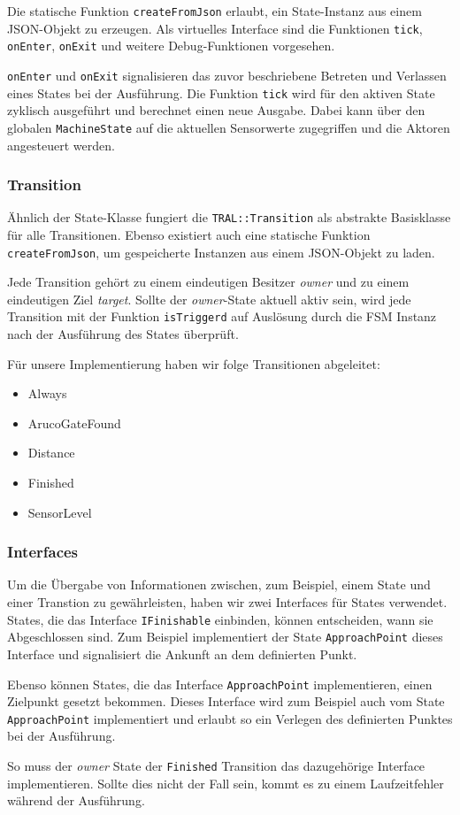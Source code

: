 Die statische Funktion \texttt{createFromJson} erlaubt, ein State-Instanz aus einem JSON-Objekt zu erzeugen. Als virtuelles Interface sind die Funktionen \texttt{tick}, \texttt{onEnter}, \texttt{onExit} und weitere Debug-Funktionen vorgesehen.

\texttt{onEnter} und \texttt{onExit} signalisieren das zuvor beschriebene Betreten und Verlassen eines States bei der Ausführung. Die Funktion \texttt{tick} wird für den aktiven State zyklisch ausgeführt und berechnet einen neue Ausgabe. Dabei kann über den globalen \texttt{MachineState} auf die aktuellen Sensorwerte zugegriffen und die Aktoren angesteuert werden.


\subsubsection{Transition}
Ähnlich der State-Klasse fungiert die \texttt{TRAL::Transition} als abstrakte Basisklasse für alle Transitionen. Ebenso existiert auch eine statische Funktion \texttt{createFromJson}, um gespeicherte Instanzen aus einem JSON-Objekt zu laden. 

Jede Transition gehört zu einem eindeutigen Besitzer \textit{owner} und zu einem eindeutigen Ziel \textit{target}. Sollte der \textit{owner}-State aktuell aktiv sein, wird jede Transition mit der Funktion \texttt{isTriggerd} auf Auslösung durch die FSM Instanz nach der Ausführung des States überprüft.

Für unsere Implementierung haben wir folge Transitionen abgeleitet:

\begin{itemize}
	\item Always
	\item ArucoGateFound
	\item Distance
	\item Finished
	\item SensorLevel
\end{itemize}

\subsubsection{Interfaces}

Um die Übergabe von Informationen zwischen, zum Beispiel, einem State und einer Transtion zu gewährleisten, haben wir zwei Interfaces für States verwendet. 
States, die das Interface \texttt{IFinishable} einbinden, können entscheiden, wann sie Abgeschlossen sind. Zum Beispiel implementiert der State \texttt{ApproachPoint} dieses Interface und signalisiert die Ankunft an dem definierten Punkt.

Ebenso können States, die das Interface \texttt{ApproachPoint} implementieren, einen Zielpunkt gesetzt bekommen. Dieses Interface wird zum Beispiel auch vom State \texttt{ApproachPoint} implementiert und erlaubt so ein Verlegen des definierten Punktes bei der Ausführung.

So muss der \textit{owner} State der \texttt{Finished} Transition das dazugehörige Interface implementieren. Sollte dies nicht der Fall sein, kommt es zu einem Laufzeitfehler während der Ausführung.
